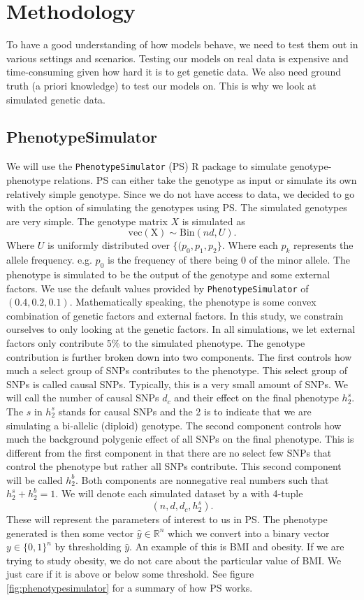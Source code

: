 \documentclass{article}
\begin{document}
\section{Methodology}
To have a good understanding of how models behave, we need to test them out in various settings and scenarios. Testing our models on real data is expensive and time-consuming given how hard it is to get genetic data. We also need ground truth (a priori knowledge) to test our models on. This is why we look at simulated genetic data.
\subsection{PhenotypeSimulator}
We will use the \texttt{PhenotypeSimulator} (PS) R package \cite{PS} to simulate genotype-phenotype relations. PS can either take the genotype as input or simulate its own relatively simple genotype. Since we do not have access to data, we decided to go with the option of simulating the genotypes using PS. The simulated genotypes are very simple. The genotype matrix $X$ is simulated as 
\[ 
\mathrm{vec(X)} \sim \mathrm{Bin}(nd, U).
\]
Where $U$ is uniformly distributed over $\{(p_0, p_1, p_2\}.$ Where each $p_k$ represents the allele frequency. e.g. $p_0$ is the frequency of there being 0 of the minor allele. The phenotype is simulated to be the output of the genotype and some external factors. We use the default values provided by \texttt{PhenotypeSimulator} of $(0.4, 0.2, 0.1).$ Mathematically speaking, the phenotype is some convex combination of genetic factors and external factors. In this study, we constrain ourselves to only looking at the genetic factors. In all simulations, we let external factors only contribute 5\% to the simulated phenotype. The genotype contribution is further broken down into two components. The first controls how much a select group of SNPs contributes to the phenotype. This select group of SNPs is called causal SNPs. Typically, this is a very small amount of SNPs. We will call the number of causal SNPs $d_c$ and their effect on the final phenotype $h_2^s.$ The $s$ in $h_2^s$ stands for causal SNPs and the 2 is to indicate that we are simulating a bi-allelic (diploid) genotype. The second component controls how much the background polygenic effect of all SNPs on the final phenotype. This is different from the first component in that there are no select few SNPs that control the phenotype but rather all SNPs contribute. This second component will be called $h_2^b.$ Both components are nonnegative real numbers such that $h_2^s + h_2^b = 1.$ We will denote each simulated dataset by a with 4-tuple 
\[
(n, d, d_c, h_2^s).    
\]
These will represent the parameters of interest to us in PS. The phenotype generated is then some vector $\hat{y} \in \mathbb{R}^n$ which we convert into a binary vector $y \in \{0, 1\}^n$ by thresholding $\hat{y}$. An example of this is BMI and obesity. If we are trying to study obesity, we do not care about the particular value of BMI. We just care if it is above or below some threshold. See figure \ref{fig:phenotypesimulator} for a summary of how PS works.
\end{document}
